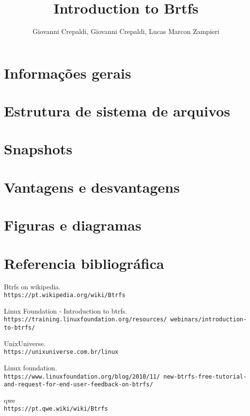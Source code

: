 \documentclass[12pt]{article}
\title{Introduction to Brtfs}
\author{Giovanni Crepaldi\inst{1}, Giovanni Crepaldi\inst{2}, Lucas Marcon Zampieri\inst{3}}
\begin{document}
\maketitle

\begin{abstract}

\end{abstract}

\begin{resumo}

\end{resumo}

\section{Informações gerais} \label{sec:firstpage}

\section{Estrutura de sistema de arquivos}

\section{Snapshots}

\section{Vantagens e desvantagens}

\section{Figuras e diagramas}\label{sec:figs}

\section{Referencia bibliográfica}

\begin{thebibliography}{9}
Btrfs on wikipedia.
\\\texttt{https://pt.wikipedia.org/wiki/Btrfs}

Linux Foundation - Introduction to btrfs.
\\\texttt{https://training.linuxfoundation.org/resources/\
webinars/introduction-to-btrfs/}

UnixUniverse.
\\\texttt{https://unixuniverse.com.br/linux}

Linux foundation.
\\\texttt{https://www.linuxfoundation.org/blog/2010/11/\
new-btrfs-free-tutorial-and-request-for-end-user-feedback-on-btrfs/}

\bibitem{qwe}
qwe
\\\texttt{https://pt.qwe.wiki/wiki/Btrfs}

\end{thebibliography}
\end{document}
